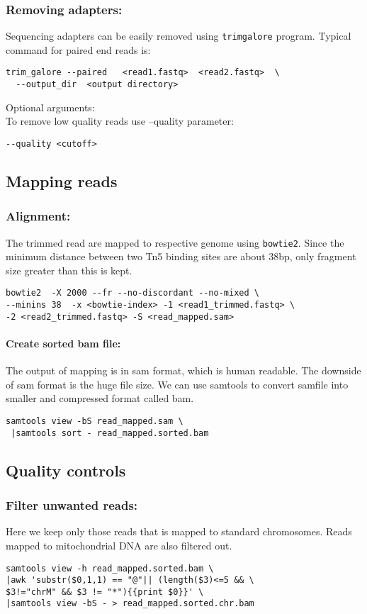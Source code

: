 \documentclass[10pt]{article}
\newcommand{\prog}[1]{\texttt{#1}}
\begin{document}
\subsubsection{Removing adapters:} Sequencing adapters can be easily removed using  \prog{trimgalore} program. Typical command for paired end reads is:\\
\begin{verbatim}
trim_galore --paired   <read1.fastq>  <read2.fastq>  \
  --output_dir  <output directory>
\end{verbatim}
Optional arguments:\\
To remove low quality reads use --quality parameter:
\begin{verbatim}
--quality <cutoff>
\end{verbatim}
\subsection{Mapping reads}
\subsubsection{Alignment:}
The trimmed read are mapped to respective genome using \prog{bowtie2}. Since the minimum distance between two Tn5 binding sites are about 38bp, only fragment size greater than this is kept.
\begin{verbatim}
bowtie2  -X 2000 --fr --no-discordant --no-mixed \
--minins 38  -x <bowtie-index> -1 <read1_trimmed.fastq> \
-2 <read2_trimmed.fastq> -S <read_mapped.sam>
\end{verbatim}
\paragraph{Create sorted bam file:} The output of mapping is in sam format, which is human readable. The downside of sam format is the huge file size. We can use samtools to convert samfile into smaller and compressed format called bam.
\begin{verbatim}
samtools view -bS read_mapped.sam \
 |samtools sort - read_mapped.sorted.bam
\end{verbatim}
\subsection{Quality controls}
\subsubsection{Filter unwanted reads:} Here we keep only those reads that is mapped to standard chromosomes. Reads mapped to mitochondrial DNA are also filtered out.
\begin{verbatim}
samtools view -h read_mapped.sorted.bam \
|awk 'substr($0,1,1) == "@"|| (length($3)<=5 && \
$3!="chrM" && $3 != "*"){{print $0}}' \
|samtools view -bS - > read_mapped.sorted.chr.bam
\end{verbatim}
\end{document}
